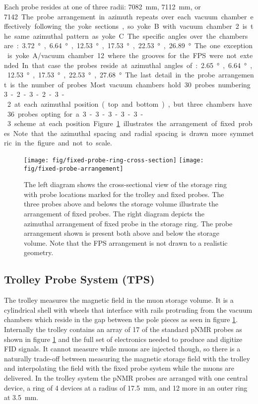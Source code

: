 Each probe resides at one of three radii: \SI{7082}{\mm}, \SI{7112}{\mm}, or \SI{7142}. The probe arrangement in azimuth repeats over each vacuum chamber effectively following the yoke sections, so yoke B with vacuum chamber 2 is the same azimuthal pattern as yoke C.  The specific angles over the chambers are: \SI{3.72}{\degree}, \SI{6.64}{\degree}, \SI{12.53}{\degree}, \SI{17.53}{\degree}, \SI{22.53}{\degree}, \SI{26.89}{\degree}.  The one exception is yoke A/vacuum chamber 12 where the grooves for the FPS were not extended.  In that case the probes reside at azimuthal angles of: \SI{2.65}{\degree}, \SI{6.64}{\degree}, \SI{12.53}{\degree}, \SI{17.53}{\degree}, \SI{22.53}{\degree}, \SI{27.68}{\degree}.  The last detail in the probe arrangement is the number of probes.  Most vacuum chambers hold 30 probes numbering 3-2-3-2-3-2 at each azimuthal position (top and bottom), but three chambers have 36 probes opting for a 3-3-3-3-3-3 scheme at each position.  Figure \ref{fig:fixed-probe-arrangement} illustrates the arrangement of fixed probes.  Note that the azimuthal spacing and radial spacing is drawn more symmetric in the figure and not to scale.

\begin{figure}
\label{fig:fixed-probe-arrangement}
\centering
\texttt{[image: fig/fixed-probe-ring-cross-section]}
\texttt{[image: fig/fixed-probe-arrangement]}
\caption{The left diagram shows the cross-sectional view of the storage ring with probe locations marked for the trolley and fixed probes.  The three probes above and belows the storage volume illustrate the arrangement of fixed probes.  The right diagram depicts the azimuthal arrangement of fixed probe in the storage ring. The probe arrangement shown is present both above and below the storage volume. Note that the FPS arrangement is not drawn to a realistic geometry.}
\end{figure}

\subsection{Trolley Probe System (TPS)}

The trolley measures the magnetic field in the muon storage volume.  It is a cylindrical shell with wheels that interface with rails protruding from the vacuum chambers which reside in the gap between the pole pieces as seen in figure \ref{fig:fixed-probe-arrangement}.  Internally the trolley contains an array of 17 of the standard pNMR probes as shown in figure \ref{fig:fixed-probe-arrangement} and the full set of electronics needed to produce and digitize FID signals.  It cannot measure while muons are injected though, so there is a naturally trade-off between measuring the magnetic storage field with the trolley and interpolating the field with the fixed probe system while the muons are delivered. In the trolley system the pNMR probes are arranged with one central device, a ring of 4 devices at a radius of \SI{17.5}{\mm}, and 12 more in an outer ring at \SI{3.5}{\mm}.

